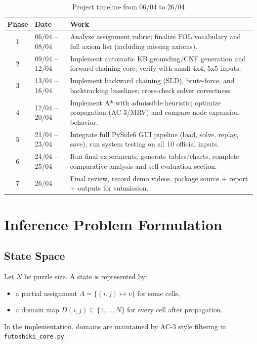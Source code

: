 \documentclass[12pt,a4paper]{article}
\begin{document}
\begin{table}[H]
\centering
\small
\renewcommand{\arraystretch}{1.3}
\setlength{\tabcolsep}{5pt}
\begin{tabular}{|c|p{2.8cm}|p{7.0cm}|}
\hline
\textbf{Phase} & \textbf{Date} & \textbf{Work} \\
\hline
1 & 06/04 -- 08/04 & Analyze assignment rubric; finalize FOL vocabulary and full axiom list (including missing axioms). \\
\hline
2 & 09/04 -- 12/04 & Implement automatic KB grounding/CNF generation and forward chaining core; verify with small 4x4, 5x5 inputs. \\
\hline
3 & 13/04 -- 16/04 & Implement backward chaining (SLD), brute-force, and backtracking baselines; cross-check solver correctness. \\
\hline
4 & 17/04 -- 20/04 & Implement A* with admissible heuristic; optimize propagation (AC-3/MRV) and compare node expansion behavior. \\
\hline
5 & 21/04 -- 23/04 & Integrate full PySide6 GUI pipeline (load, solve, replay, save), run system testing on all 10 official inputs. \\
\hline
6 & 24/04 -- 25/04 & Run final experiments, generate tables/charts, complete comparative analysis and self-evaluation section. \\
\hline
7 & 26/04 & Final review, record demo videos, package source + report + outputs for submission. \\
\hline
\end{tabular}
\caption{Project timeline from 06/04 to 26/04}
\end{table}

\section{Inference Problem Formulation}

\subsection{State Space}
Let $N$ be puzzle size. A state is represented by:
\begin{itemize}
    \item a partial assignment $A = \{(i,j)\mapsto v\}$ for some cells,
    \item a domain map $D(i,j)\subseteq\{1,\dots,N\}$ for every cell after propagation.
\end{itemize}
In the implementation, domains are maintained by AC-3 style filtering in \texttt{futoshiki\_core.py}.
\end{document}
